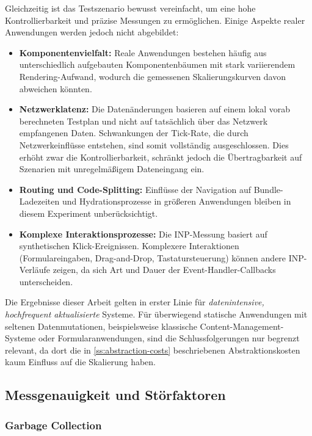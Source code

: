 Gleichzeitig ist das Testszenario bewusst vereinfacht, um eine hohe Kontrollierbarkeit und präzise Messungen zu ermöglichen. Einige Aspekte realer Anwendungen werden jedoch nicht abgebildet:

\begin{itemize}
	\item \textbf{Komponentenvielfalt:} Reale Anwendungen bestehen häufig aus unterschiedlich aufgebauten Komponentenbäumen mit stark variierendem Rendering-Aufwand, wodurch die gemessenen Skalierungskurven davon abweichen könnten.
	\item \textbf{Netzwerklatenz:} Die Datenänderungen basieren auf einem lokal vorab berechneten Testplan und nicht auf tatsächlich über das Netzwerk empfangenen Daten. Schwankungen der Tick-Rate, die durch Netzwerkeinflüsse entstehen, sind somit vollständig ausgeschlossen. Dies erhöht zwar die Kontrollierbarkeit, schränkt jedoch die Übertragbarkeit auf Szenarien mit unregelmäßigem Dateneingang ein.
	\item \textbf{Routing und Code-Splitting:} Einflüsse der Navigation auf Bundle-Ladezeiten und Hydrationsprozesse in größeren Anwendungen bleiben in diesem Experiment unberücksichtigt.
	\item \textbf{Komplexe Interaktionsprozesse:} Die INP-Messung basiert auf synthetischen Klick-Ereignissen. Komplexere Interaktionen (Formulareingaben, Drag-and-Drop, Tastatursteuerung) können andere INP-Verläufe zeigen, da sich Art und Dauer der Event-Handler-Callbacks unterscheiden.
\end{itemize}
Die Ergebnisse dieser Arbeit gelten in erster Linie für \emph{datenintensive, hochfrequent aktualisierte} Systeme. Für überwiegend statische Anwendungen mit seltenen Datenmutationen, beispielsweise klassische Content-Management-Systeme oder Formularanwendungen, sind die Schlussfolgerungen nur begrenzt relevant, da dort die in \cref{ss:abstraction-costs} beschriebenen Abstraktionskosten kaum Einfluss auf die Skalierung haben.

\subsection{Messgenauigkeit und Störfaktoren}
\label{ss:measurement-accuracy}

\subsubsection{Garbage Collection}
\label{sss:gc-interference}

